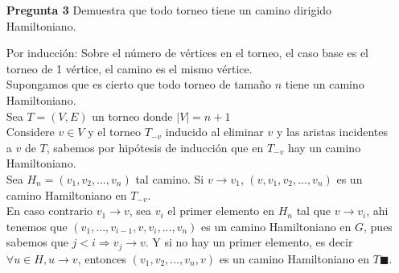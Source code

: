 \documentclass[12pt]{article}
\begin{document}
\lstset{language=python}
\begin{itemize}
\item[\bf{Pregunta 3}] Demuestra que todo torneo tiene un camino dirigido Hamiltoniano.
\item[Por inducción:]
  Sobre el número de vértices en el torneo, el caso base es el torneo de 1 vértice, el camino es el mismo vértice.\\
  Supongamos que es cierto que todo torneo de tamaño $n$ tiene un camino Hamiltoniano.\\
  Sea $T=(V,E)$ un torneo donde $|V|=n+1$\\
  Considere $v \in V$ y el torneo $T_{-v}$ inducido al eliminar $v$ y las aristas incidentes a $v$ de $T$, sabemos por hipótesis de inducción que en $T_{-v}$ hay un camino Hamiltoniano.\\
    Sea $H_{n}=(v_1,v_2,...,v_n)$ tal camino.
      Si $v \rightarrow v_{1}$, $(v,v_1,v_2,...,v_n)$ es un camino Hamiltoniano en $T_{-v}$.\\
      En caso contrario $v_1 \rightarrow v$, sea $v_i$ el primer elemento en $H_{n}$ tal que $v \rightarrow v_i$, ahi tenemos que $(v_1,...,v_{i-1},v,v_i,...,v_n)$ es un camino Hamiltoniano en $G$, pues sabemos que $j<i \Rightarrow v_{j} \rightarrow v$.
      Y si no hay un primer elemento, es decir $\forall u \in H, u \rightarrow v$, entonces $(v_1,v_2,...,v_n,v)$ es un camino Hamiltoniano en $T \blacksquare$.\\
\end{itemize}
\end{document}
